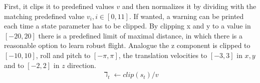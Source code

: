 First, it clips it to predefined values $v$ and then normalizes it by dividing with the matching predefined value $v_i, i\in[0,11]$. 
If wanted, a warning can be printed each time a state parameter has to be clipped. 
By clipping x and y to a value in $[-20,20]$ there is a predefined limit of maximal distance, in which there is a reasonable option to learn robust flight. 
Analogue the z component is clipped to $[-10,10]$, roll and pitch to $[-\pi, \pi]$, the translation velocities to $[-3, 3]$ in $x, y$ and to $[-2,2]$ in $z$ direction. 
\newline
\begin{align}
	\daleth_t \leftarrow clip(s_t) / v \label{eq:clipnorm}
\end{align}
\newline

\newpage

